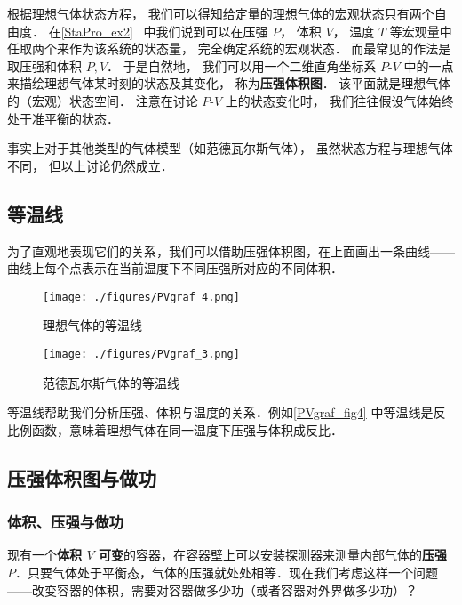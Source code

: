 
\begin{issues}
\issueDraft
\end{issues}


根据理想气体状态方程， 我们可以得知给定量的理想气体的宏观状态只有两个自由度． 在\autoref{StaPro_ex2}~ 中我们说到可以在压强 $P$， 体积 $V$， 温度 $T$ 等宏观量中任取两个来作为该系统的状态量， 完全确定系统的宏观状态． 而最常见的作法是取压强和体积 $P,V$． 于是自然地， 我们可以用一个二维直角坐标系 $P$-$V$ 中的一点来描绘理想气体某时刻的状态及其变化， 称为\textbf{压强体积图}． 该平面就是理想气体的（宏观）状态空间． 注意在讨论 $P$-$V$ 上的状态变化时， 我们往往假设气体始终处于准平衡的状态．

事实上对于其他类型的气体模型（如范德瓦尔斯气体）， 虽然状态方程与理想气体不同， 但以上讨论仍然成立．


\subsection{等温线}
为了直观地表现它们的关系，我们可以借助压强体积图，在上面画出一条曲线——曲线上每个点表示在当前温度下不同压强所对应的不同体积．
\begin{figure}[ht]
\centering
\texttt{[image: ./figures/PVgraf\_4.png]}
\caption{理想气体的等温线} \label{PVgraf_fig4}
\end{figure}
\begin{figure}[ht]
\centering
\texttt{[image: ./figures/PVgraf\_3.png]}
\caption{范德瓦尔斯气体的等温线} \label{PVgraf_fig3}
\end{figure}

等温线帮助我们分析压强、体积与温度的关系．例如\autoref{PVgraf_fig4} 中等温线是反比例函数，意味着理想气体在同一温度下压强与体积成反比．

\subsection{压强体积图与做功}

\subsubsection{体积、压强与做功}
现有一个\textbf{体积 $V$ 可变}的容器，在容器壁上可以安装探测器来测量内部气体的\textbf{压强 $P$}．只要气体处于平衡态，气体的压强就处处相等．现在我们考虑这样一个问题——改变容器的体积，需要对容器做多少功（或者容器对外界做多少功）？

